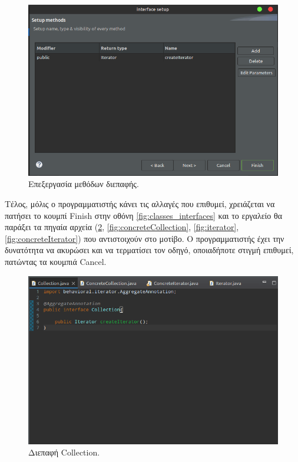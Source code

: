 \begin{figure}[H]
    \centering
    \includegraphics[width=1.0\textwidth]{Figures/edit_interface_methods.png}
    \caption{Επεξεργασία μεθόδων διεπαφής.}
    \label{fig:edit_interface_methods}
\end{figure}
Τέλος, μόλις ο προγραμματιστής κάνει τις αλλαγές που επιθυμεί, χρειάζεται να πατήσει το κουμπί Finish 
στην οθόνη \ref{fig:classes_interfaces} και το εργαλείο θα παράξει τα πηγαία αρχεία (\ref{fig:collection}, \ref{fig:concreteCollection}, \ref{fig:iterator}, \ref{fig:concreteIterator}) 
που αντιστοιχούν στο μοτίβο. 
Ο προγραμματιστής έχει την δυνατότητα να ακυρώσει και να τερματίσει τον οδηγό, οποιαδήποτε στιγμή επιθυμεί, πατώντας τα κουμπιά Cancel.
\begin{figure}[H]
    \centering
    \includegraphics[width=1.0\textwidth]{Figures/collection.png}
    \caption{Διεπαφή Collection.}
    \label{fig:collection}
\end{figure}
